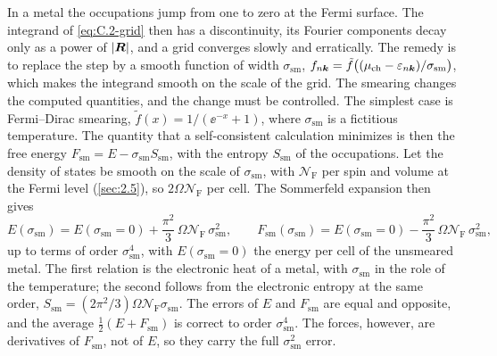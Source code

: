 In a metal the occupations jump from one to zero at the Fermi surface. The integrand of \cref{eq:C.2-grid} then has a discontinuity, its Fourier components decay only as a power of $|\bm{R}|$, and a grid converges slowly and erratically. The remedy is to replace the step by a smooth function of width $\sigma_{\mathrm{sm}}$, $f_{n\bm{k}} = \tilde f\bigl((\mu_{\mathrm{ch}} - \varepsilon_{n\bm{k}})/\sigma_{\mathrm{sm}}\bigr)$, which makes the integrand smooth on the scale of the grid. The smearing changes the computed quantities, and the change must be controlled. The simplest case is Fermi--Dirac smearing, $\tilde f(x) = 1/(\ee^{-x} + 1)$, where $\sigma_{\mathrm{sm}}$ is a fictitious temperature. The quantity that a self-consistent calculation minimizes is then the free energy $F_{\mathrm{sm}} = E - \sigma_{\mathrm{sm}}S_{\mathrm{sm}}$, with the entropy $S_{\mathrm{sm}}$ of the occupations. Let the density of states be smooth on the scale of $\sigma_{\mathrm{sm}}$, with $\mathcal{N}_{\mathrm{F}}$ per spin and volume at the Fermi level (\cref{sec:2.5}), so $2\Omega\mathcal{N}_{\mathrm{F}}$ per cell. The Sommerfeld expansion then gives
\begin{equation}
  E(\sigma_{\mathrm{sm}}) = E(\sigma_{\mathrm{sm}} = 0) + \frac{\pi^2}{3}\,\Omega\mathcal{N}_{\mathrm{F}}\,\sigma_{\mathrm{sm}}^2, \qquad
  F_{\mathrm{sm}}(\sigma_{\mathrm{sm}}) = E(\sigma_{\mathrm{sm}} = 0) - \frac{\pi^2}{3}\,\Omega\mathcal{N}_{\mathrm{F}}\,\sigma_{\mathrm{sm}}^2 ,
  \label{eq:E.1-sommerfeld}
\end{equation}
up to terms of order $\sigma_{\mathrm{sm}}^4$, with $E(\sigma_{\mathrm{sm}} = 0)$ the energy per cell of the unsmeared metal. The first relation is the electronic heat of a metal, with $\sigma_{\mathrm{sm}}$ in the role of the temperature; the second follows from the electronic entropy at the same order, $S_{\mathrm{sm}} = (2\pi^2/3)\Omega\mathcal{N}_{\mathrm{F}}\sigma_{\mathrm{sm}}$. The errors of $E$ and $F_{\mathrm{sm}}$ are equal and opposite, and the average $\tfrac12(E + F_{\mathrm{sm}})$ is correct to order $\sigma_{\mathrm{sm}}^4$. The forces, however, are derivatives of $F_{\mathrm{sm}}$, not of $E$, so they carry the full $\sigma_{\mathrm{sm}}^2$ error.

